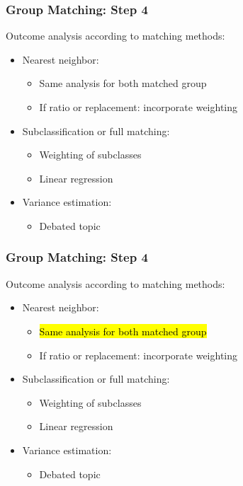 \documentclass[xcolor=table]{beamer}
\makeatletter
\let\HL\hl
\renewcommand\hl{%
	\let\set@color\beamerorig@set@color
	\let\reset@color\beamerorig@reset@color
	\HL}
\makeatother
\begin{document}

\begin{frame}
	\frametitle{Group Matching: Step 4}
	Outcome analysis according to matching methods:
	\begin{itemize}[label=$\bullet$]
		\item Nearest neighbor:
		\begin{itemize}[label=$-$]
			\item Same analysis for both matched group
			\item If ratio or replacement: incorporate weighting
		\end{itemize}
		\item Subclassification or full matching:
		\begin{itemize}[label=$-$]
			\item Weighting of subclasses
			\item Linear regression
		\end{itemize}
		\item Variance estimation:
		\begin{itemize}[label=$-$]
			\item Debated topic
		\end{itemize}
	\end{itemize}
\end{frame}


\begin{frame}[noframenumbering]
	\frametitle{Group Matching: Step 4}
	Outcome analysis according to matching methods:
	\begin{itemize}[label=$\bullet$]
		\item Nearest neighbor:
		\begin{itemize}[label=$-$]
			\item \hl{Same analysis for both matched group}
			\item If ratio or replacement: incorporate weighting
		\end{itemize}
		\item Subclassification or full matching:
		\begin{itemize}[label=$-$]
			\item Weighting of subclasses
			\item Linear regression
		\end{itemize}
		\item Variance estimation:
		\begin{itemize}[label=$-$]
			\item Debated topic
		\end{itemize}
	\end{itemize}
\end{frame}
\end{document}
